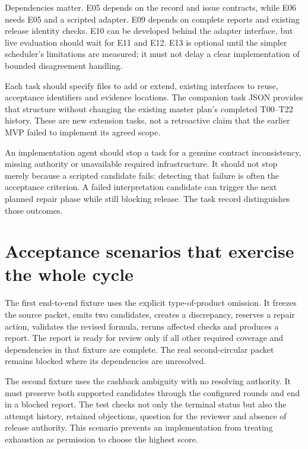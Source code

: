 \documentclass[12pt,a4paper,oneside,openany]{book}
\begin{document}
Dependencies matter. E05 depends on the record and issue contracts, while E06
needs E05 and a scripted adapter. E09 depends on complete reports and existing
release identity checks. E10 can be developed behind the adapter interface, but
live evaluation should wait for E11 and E12. E13 is optional until the simpler
scheduler's limitations are measured; it must not delay a clear implementation
of bounded disagreement handling.

Each task should specify files to add or extend, existing interfaces to reuse,
acceptance identifiers and evidence locations. The companion task JSON provides
that structure without changing the existing master plan's completed T00--T22
history. These are new extension tasks, not a retroactive claim that the earlier
MVP failed to implement its agreed scope.

An implementation agent should stop a task for a genuine contract inconsistency,
missing authority or unavailable required infrastructure. It should not stop
merely because a scripted candidate fails: detecting that failure is often the
acceptance criterion. A failed interpretation candidate can trigger the next
planned repair phase while still blocking release. The task record distinguishes
those outcomes.

\section{Acceptance scenarios that exercise the whole cycle}
\label{merge:M08:12}


The first end-to-end fixture uses the explicit type-of-product omission. It
freezes the source packet, emits two candidates, creates a discrepancy, reserves
a repair action, validates the revised formula, reruns affected checks and
produces a report. The report is ready for review only if all other required
coverage and dependencies in that fixture are complete. The real second-circular
packet remains blocked where its dependencies are unresolved.

The second fixture uses the cashback ambiguity with no resolving authority. It
must preserve both supported candidates through the configured rounds and end in
a blocked report. The test checks not only the terminal status but also the
attempt history, retained objections, question for the reviewer and absence of
release authority. This scenario prevents an implementation from treating
exhaustion as permission to choose the highest score.
\end{document}
